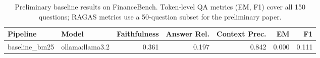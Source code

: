 \begin{table}[t]
\centering
\caption{Preliminary baseline results on FinanceBench. Token-level QA metrics (EM, F1) cover all 150 questions; RAGAS metrics use a 50-question subset for the preliminary paper.}
\label{tab:prelim-results}
\begin{tabular}{llrrrrr}
\toprule
Pipeline & Model & Faithfulness & Answer Rel. & Context Prec. & EM & F1 \\
\midrule
baseline\_bm25 & ollama:llama3.2 & 0.361 & 0.197 & 0.842 & 0.000 & 0.111 \\
\bottomrule
\end{tabular}
\end{table}
